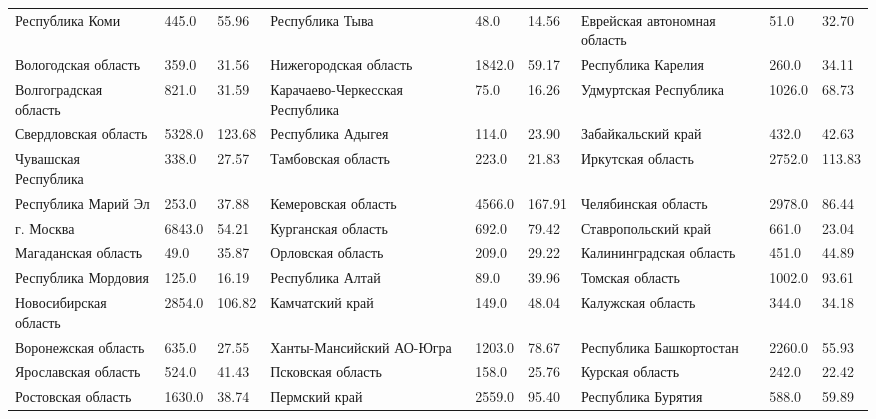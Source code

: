 \begin{landscape}
\begin{table}[]
{\begin{tabular}{|l|l|l|l|l|l|l|l|l|}
				Республика Коми                   & 445.0  & 55.96  & Республика Тыва                 & 48.0   & 14.56  & Еврейская автономная область & 51.0   & 32.70  \\
				Вологодская область               & 359.0  & 31.56  & Нижегородская область           & 1842.0 & 59.17  & Республика Карелия           & 260.0  & 34.11  \\
				Волгоградская область             & 821.0  & 31.59  & Карачаево-Черкесская Республика & 75.0   & 16.26  & Удмуртская Республика        & 1026.0 & 68.73  \\
				Свердловская область              & 5328.0 & 123.68 & Республика Адыгея               & 114.0  & 23.90  & Забайкальский край           & 432.0  & 42.63  \\
				Чувашская Республика              & 338.0  & 27.57  & Тамбовская область              & 223.0  & 21.83  & Иркутская область            & 2752.0 & 113.83 \\
				Республика Марий Эл               & 253.0  & 37.88  & Кемеровская область             & 4566.0 & 167.91 & Челябинская область          & 2978.0 & 86.44  \\
				г. Москва                         & 6843.0 & 54.21  & Курганская область              & 692.0  & 79.42  & Ставропольский край          & 661.0  & 23.04  \\
				Магаданская область               & 49.0   & 35.87  & Орловская область               & 209.0  & 29.22  & Калининградская область      & 451.0  & 44.89  \\
				Республика Мордовия               & 125.0  & 16.19  & Республика Алтай                & 89.0   & 39.96  & Томская область              & 1002.0 & 93.61  \\
				Новосибирская область             & 2854.0 & 106.82 & Камчатский край                 & 149.0  & 48.04  & Калужская область            & 344.0  & 34.18  \\
				Воронежская область               & 635.0  & 27.55  & Ханты-Мансийский АО-Югра        & 1203.0 & 78.67  & Республика Башкортостан      & 2260.0 & 55.93  \\
				Ярославская область               & 524.0  & 41.43  & Псковская область               & 158.0  & 25.76  & Курская область              & 242.0  & 22.42  \\
				Ростовская область                & 1630.0 & 38.74  & Пермский край                   & 2559.0 & 95.40  & Республика Бурятия           & 588.0  & 59.89  \\

\end{tabular}}
\end{table}
\end{landscape}
